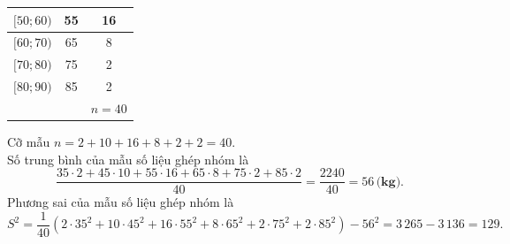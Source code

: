 \begin{ex}
{\begin{itemchoice}
\begin{center}
\begin{tabular}{|c|c|c|}
					\hline
					$[50; 60)$ & 55 & 16 \\
					\hline
					$[60; 70)$ & 65 & 8 \\
					\hline
					$[70; 80)$ & 75 & 2 \\
					\hline
					$[80; 90)$ & 85 & 2 \\
					\hline
					& & $n=40$ \\
					\hline
				\end{tabular}
			\end{center}				
			Cỡ mẫu $n=2+10+16+8+2+2=40$.\\
			Số trung bình của mẫu số liệu ghép nhóm là
			$$
			\dfrac{35\cdot 2+45\cdot 10+55\cdot 16+65\cdot 8+75\cdot 2+85\cdot 2}{40}=\dfrac{2240}{40}=56\, \textbf{(kg).}
			$$ 
			Phương sai của mẫu số liệu ghép nhóm là
			$$ S^2=\dfrac{1}{40}\left(2\cdot 35^2+10\cdot 45^2+16\cdot 55^2+8\cdot 65^2+2\cdot 75^2+2\cdot 85^2\right)-56^2=3\,265-3\,136=129.
			$$
		\end{itemchoice}
	}
\end{ex}

